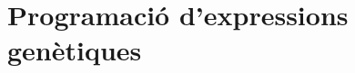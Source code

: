 \documentclass[titlepage,a4paper,12pt]{book}
\begin{document}





\section{Programació d'expressions genètiques} %
\label{sec:Programacio d'expressions genetiques}
\end{document}
